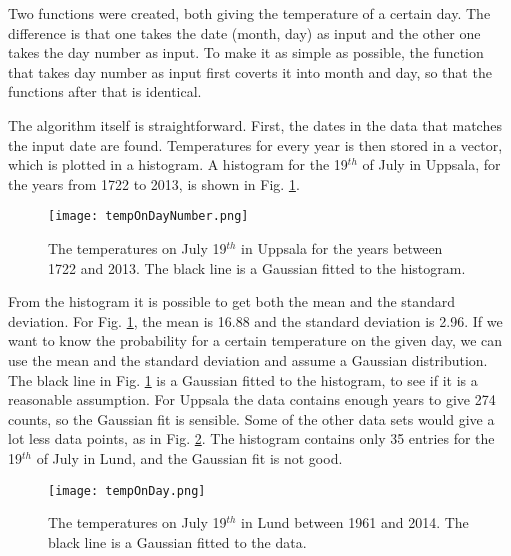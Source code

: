 


Two functions were created, both giving the temperature of a certain day. The difference is that one takes the date (month, day) as input and the other one takes the day number as input. To make it as simple as possible, the function that takes day number as input first coverts it into month and day, so that the functions after that is identical. 

The algorithm itself is straightforward. First, the dates in the data that matches the input date are found. Temperatures for every year is then stored in a vector, which is plotted in a histogram. A histogram for the 19$^{th}$ of July in Uppsala, for the years from 1722 to 2013, is shown in Fig. \ref{fig:tempOnDayNumber}.

\begin{figure}[h]
\begin{center}
\texttt{[image: tempOnDayNumber.png]}
\caption{\label{fig:tempOnDayNumber} The temperatures on July 19$^{th}$ in Uppsala for the years between 1722 and 2013. The black line is a Gaussian fitted to the histogram.}
\end{center}
\end{figure}

From the histogram it is possible to get both the mean and the standard deviation. For Fig. \ref{fig:tempOnDayNumber}, the mean is 16.88 and the standard deviation is 2.96. If we want to know the probability for a certain temperature on the given day, we can use the mean and the standard deviation and assume a Gaussian distribution. The black line in Fig. \ref{fig:tempOnDayNumber} is a Gaussian fitted to the histogram, to see if it is a reasonable assumption. For Uppsala the data contains enough years to give 274 counts, so the Gaussian fit is sensible. Some of the other data sets would give a lot less data points, as in Fig. \ref{fig:tempOnDay}. The histogram contains only 35 entries for the 19$^{th}$ of July in Lund, and the Gaussian fit is not good. 

\begin{figure}[h]
\begin{center}
\texttt{[image: tempOnDay.png]}
\caption{\label{fig:tempOnDay} The temperatures on July 19$^{th}$ in Lund between 1961 and 2014. The black line is a Gaussian fitted to the data.}
\end{center}
\end{figure}

\begin{comment}
\begin{figure}[h]
\centering
\subfloat[Uppsala]{\label{fig:tempOnDayNumber2}\texttt{[image: tempOnDayNumber.png]}} 
\subfloat[Lund]{\label{fig:tempOnDay2}\texttt{[image: tempOnDay.png]}}\\
\caption{The temperatures on July 19$^{th}$ in Uppsala for the years between 1722 and 2013 in (a). The black line is a Gaussian fitted to the histogram.}
\label{fig:spring}
\end{figure}
\end{comment}


